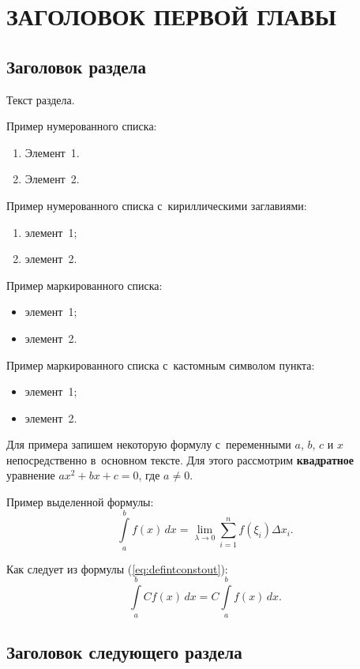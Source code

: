 \section{\MakeTextUppercase{Заголовок первой главы}}

\subsection{Заголовок раздела}

Текст раздела.

Пример нумерованного списка:
\begin{enumerate}[label=\arabic*.]
	\item Элемент~1.
	\item Элемент~2.
\end{enumerate}

Пример нумерованного списка с~кириллическими заглавиями:
\begin{enumerate}[label=\asbuk*)]
	\item элемент~1;
	\item элемент~2.
\end{enumerate}

Пример маркированного списка:
\begin{itemize}
	\item элемент~1;
	\item элемент~2.
\end{itemize}

Пример маркированного списка с~кастомным символом пункта:
\begin{itemize}[label=--]
	\item элемент~1;
	\item элемент~2.
\end{itemize}

Для примера запишем некоторую формулу с~переменными $a$, $b$, $c$ и $x$ непосредственно в~основном тексте. Для этого рассмотрим \textbf{квадратное} уравнение $ax^2+bx+c=0$, где $a\neq 0$.

Пример выделенной формулы:
$$\int\limits_a^bf(x)\,dx=\lim_{\lambda\rightarrow0}\sum\limits_{i=1}^nf(\xi_i)\Delta x_i.$$

Как следует из формулы (\ref{eq:defintconstout}):
\begin{equation}\label{eq:defintconstout}
	\int\limits_a^bCf(x)\,dx=C\int\limits_a^bf(x)\,dx.
\end{equation}

\newpage

\subsection{Заголовок следующего раздела}

